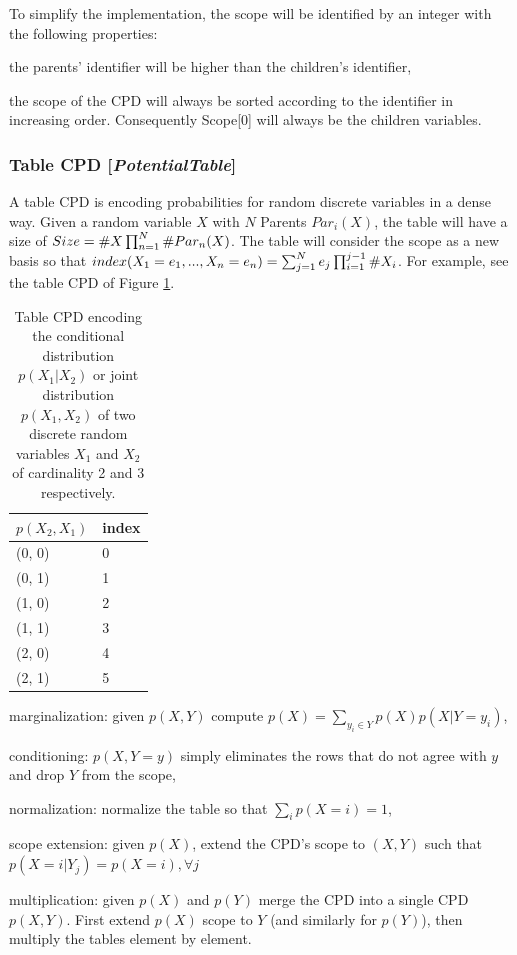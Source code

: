 \documentclass[11pt]{article}
\newcommand{\nllref}[1]{[\small{\textit{#1}}]}
\newcommand{\counta}[1]{\small{\#}#1}
\begin{document}
To simplify the implementation, the scope will be identified by an integer with the following properties:
\begin{compactitem}
\item the parents' identifier will be higher than the children's identifier,
\item the scope of the CPD will always be sorted according to the identifier in increasing order. Consequently Scope[0] will always be the children variables.
\end{compactitem}

\subsubsection{Table CPD \nllref{PotentialTable}}
A table CPD is encoding probabilities for random discrete variables in a dense way. Given a random variable $X$ with $N$ Parents $Par_i(X)$, the table will have a size of $Size=\counta{X}\prod_{n=1}^{N} \counta{Par_n(X)}$. The table will consider the scope as a new basis so that $index(X_1=e_1, ..., X_n=e_n)=\sum_{j=1}^N e_j \prod_{i=1}^{j-1}\counta{X_i} $. For example, see the table CPD of Figure \ref{tablecpd1}.

\begin{table}[h]
\label{tablecpd1}
\centering
\begin{tabular}{| l | l |}
\hline
$p(X_2, X_1)$ & index\\
\hline\hline
(0, 0) & 0\\
\hline
(0, 1) & 1\\
\hline
(1, 0) & 2\\
\hline
(1, 1) & 3\\
\hline
(2, 0) & 4\\
\hline
(2, 1) & 5\\
\hline
\end{tabular}
\caption{Table CPD encoding the conditional distribution $p(X_1|X_2)$ or joint distribution $p(X_1,X_2)$ of two discrete random variables $X_1$ and $X_2$ of cardinality 2 and 3 respectively.}
\end{table}


\begin{compactitem}
\item marginalization: given $p(X,Y)$ compute $p(X) = \sum_{y_i \in Y}p(X)p(X|Y=y_i)$,
\item conditioning: $p(X,Y=y)$ simply eliminates the rows that do not agree with $y$ and drop $Y$ from the scope,
\item normalization: normalize the table so that $\sum_ip(X=i)=1$,
\item scope extension: given $p(X)$, extend the CPD's scope to $(X, Y)$ such that $p(X=i|Y_j) = p(X=i), \forall j$
\item multiplication: given $p(X)$ and $p(Y)$ merge the CPD into a single CPD $p(X,Y)$. First extend $p(X)$ scope to $Y$ (and similarly for $p(Y)$), then multiply the tables element by element.
\end{compactitem}
\end{document}
